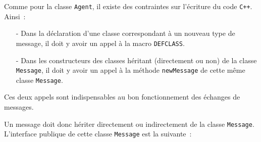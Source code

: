 \documentclass[12pt]{article}
\begin{document}
\vspace{0.2cm}

Comme pour la classe {\tt Agent}, il existe des contraintes sur l'\'ecriture
du code {\tt C++}. Ainsi~:
\begin{itemize}
\vspace{-0.2cm}
\item[-] Dans la d\'eclaration d'une classe correspondant \`a un
nouveau type de message, il doit y avoir un appel \`a la
macro {\tt DEFCLASS}.
\vspace{-0.2cm}
\item[-] Dans les constructeurs des classes h\'eritant (directement ou non)
de la classe {\tt Message}, il doit y avoir un appel \`a la m\'ethode
{\tt newMessage} de cette m\^eme classe {\tt Message}.
\end{itemize}

Ces deux appels sont indispensables au bon fonctionnement des
\'echanges de messages.

Un message doit donc h\'eriter directement
ou indirectement de la classe {\tt Message}.
L'inter\-fa\-ce publique de cette classe {\tt Message} est la suivante~:

\vspace{0.2cm}
\end{document}
